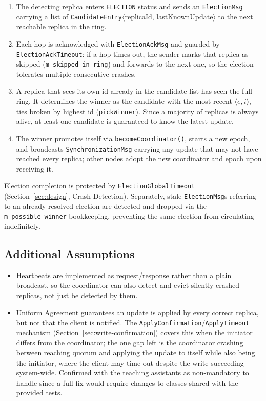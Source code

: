 \begin{enumerate}[leftmargin=*]
  \item The detecting replica enters \texttt{ELECTION} status and sends an \texttt{ElectionMsg}
  carrying a list of \texttt{CandidateEntry}$\langle$replicaId, lastKnownUpdate$\rangle$ to the next
  reachable replica in the ring.
  \item Each hop is acknowledged with \texttt{ElectionAckMsg} and guarded by
  \texttt{ElectionAckTimeout}: if a hop times out, the sender marks that replica as skipped
  (\texttt{m\_skipped\_in\_ring}) and forwards to the next one, so the election tolerates multiple
  consecutive crashes.
  \item A replica that sees its own id already in the candidate list has seen the full ring. It
  determines the winner as the candidate with the most recent $\langle e,i\rangle$, ties broken by
  highest id (\texttt{pickWinner}). Since a majority of replicas is always alive, at least one
  candidate is guaranteed to know the latest update.
  \item The winner promotes itself via \texttt{becomeCoordinator()}, starts a new epoch, and
  broadcasts \texttt{SynchronizationMsg} carrying any update that may not have reached every
  replica; other nodes adopt the new coordinator and epoch upon receiving it.
\end{enumerate}

Election completion is protected by \texttt{ElectionGlobalTimeout} (Section~\ref{sec:design},
Crash Detection). Separately, stale \texttt{ElectionMsg}s referring to an already-resolved election
are detected and dropped via the \texttt{m\_possible\_winner} bookkeeping, preventing the same
election from circulating indefinitely.

\subsection{Additional Assumptions}

\begin{itemize}[leftmargin=*]
  \item Heartbeats are implemented as request/response rather than a plain broadcast, so the
coordinator can also detect and evict silently crashed replicas, not just be detected by them.
\item Uniform Agreement guarantees an update is applied by every correct replica, but not that the
client is notified. The \texttt{ApplyConfirmation}/\texttt{ApplyTimeout} mechanism (Section~\ref{sec:write-confirmation}) covers this when
the initiator differs from the coordinator; the one gap left is the coordinator crashing between
reaching quorum and applying the update to itself while also being the initiator, where the client
may time out despite the write succeeding system-wide. Confirmed with the teaching assistants as
non-mandatory to handle since a full fix would require changes to classes shared with the provided tests.
\end{itemize}
